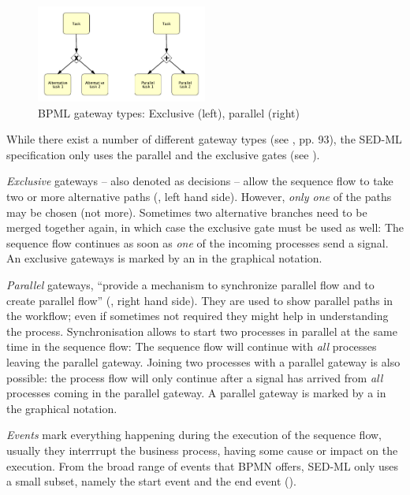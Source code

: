 \begin{figure}[h]
\centering
\includegraphics[width=0.5\textwidth]{images/gateways.pdf}
\caption{BPML gateway types: Exclusive (left), parallel (right)}
\label{fig:gateways}
\end{figure}

While there exist a number of different gateway types (see \citep{White:2004}, pp. 93), the SED-ML specification only uses the parallel and the exclusive gates  (see ). 

\emph{Exclusive} gateways -- also denoted as decisions -- allow the sequence flow to take two or more alternative paths (, left hand side). However, \emph{only one} of the paths may be chosen (not more). Sometimes two alternative branches need to be merged together again, in which case the exclusive gate must be used as well: The sequence flow continues as soon as \emph{one} of the incoming processes send a signal. An exclusive gateways is marked by an  in the graphical notation.

\emph{Parallel} gateways, ``provide a mechanism to synchronize parallel flow and to create parallel flow'' \citep{White:2004} (, right hand side). They are used to show parallel paths in the workflow; even if sometimes not required they might help in understanding the process. Synchronisation allows to start two processes in parallel at the same time in the sequence flow: The sequence flow will continue with \emph{all} processes leaving the parallel gateway. Joining two processes with a parallel gateway is also possible: the process flow will only continue after a signal has arrived from \emph{all} processes coming in the parallel gateway. A parallel gateway is marked by a \code{+} in the graphical notation.

\emph{Events} mark everything happening during the execution of the sequence flow, usually they interrrupt the business process, having some cause or impact on the execution. From the broad range of events that BPMN offers, SED-ML only uses a small subset, namely the start event and the end event ().

